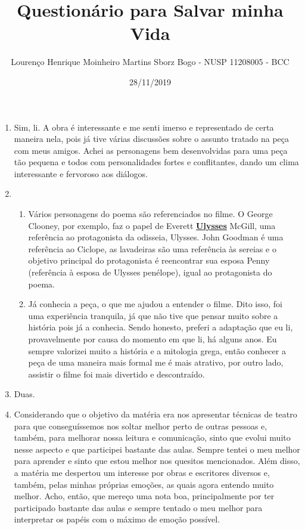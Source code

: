 \documentclass[12pt, oneside]{article}
\title{Questionário para Salvar minha Vida}
\author{Lourenço Henrique Moinheiro Martins Sborz Bogo - NUSP 11208005 - BCC}
\date{28/11/2019}
\newcommand{\mytitle}[1]{\textbf{\underline{#1}}}
\begin{document}
\maketitle
\begin{enumerate}
\item Sim, li. A obra é interessante e me senti imerso e representado de certa maneira nela, pois já tive várias discussões sobre o assunto tratado na peça com meus amigos. Achei as personagens bem desenvolvidas para uma peça tão pequena e todos com personalidades fortes e conflitantes, dando um clima interessante e fervoroso aos diálogos.
\item
  \begin{enumerate}
  \item Vários personagens do poema são referenciados no filme. O George Clooney, por exemplo, faz o papel de Everett \mytitle{Ulysses} McGill, uma referência ao protagonista da odisseia, Ulysses. John Goodman é uma referência ao Ciclope, as lavadeiras são uma referência às sereias e o objetivo principal do protagonista é reencontrar sua esposa Penny (referência à esposa de Ulysses penélope), igual ao protagonista do poema.
  \item Já conhecia a peça, o que me ajudou a entender o filme. Dito isso, foi uma experiência tranquila, já que não tive que pensar muito sobre a história pois já a conhecia. Sendo honesto, preferi a adaptação que eu li, provavelmente por causa do momento em que li, há alguns anos. Eu sempre valorizei muito a história e a mitologia grega, então conhecer a peça de uma maneira mais formal me é mais atrativo, por outro lado, assistir o filme foi mais divertido e descontraído.
  \end{enumerate}
\item Duas.
\item Considerando que o objetivo da matéria era nos apresentar técnicas de teatro para que conseguíssemos nos soltar melhor perto de outras pessoas e, também, para melhorar nossa leitura e comunicação, sinto que evolui muito nesse aspecto e que participei bastante das aulas. Sempre tentei o meu melhor para aprender e sinto que estou melhor nos quesitos mencionados. Além disso, a matéria me despertou um interesse por obras e escritores diversos e, também, pelas minhas próprias emoções, as quais agora entendo muito melhor. Acho, então, que mereço uma nota boa, principalmente por ter participado bastante das aulas e sempre tentado o meu melhor para interpretar os papéis com o máximo de emoção possível.
\end{enumerate}
\end{document}
